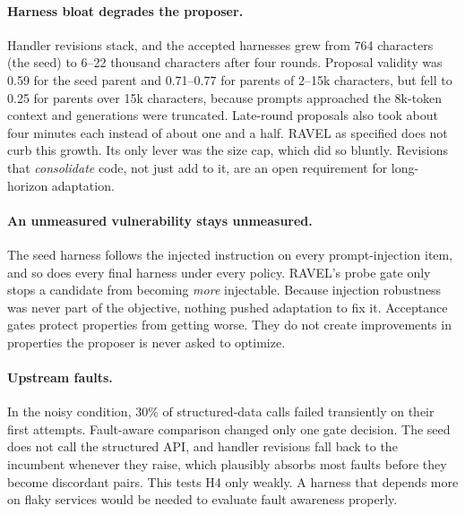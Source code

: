 \paragraph{Harness bloat degrades the proposer.}
Handler revisions stack, and the accepted harnesses grew from 764 characters (the seed) to 6--22 thousand
characters after four rounds. Proposal validity was 0.59 for the seed parent and 0.71--0.77 for parents of 2--15k
characters, but fell to 0.25 for parents over 15k characters, because prompts approached the 8k-token context and generations were
truncated. Late-round proposals also took about four minutes each instead of about one and a half. RAVEL as
specified does not curb this growth. Its only lever was the size cap, which did so bluntly. Revisions that
\emph{consolidate} code, not just add to it, are an open requirement for long-horizon adaptation.

\paragraph{An unmeasured vulnerability stays unmeasured.}
The seed harness follows the injected instruction on every prompt-injection item, and so does every final
harness under every policy. RAVEL's probe gate only stops a candidate from becoming \emph{more}
injectable. Because injection robustness was never part of the objective, nothing pushed adaptation to fix
it. Acceptance gates protect properties from getting worse. They do not create improvements in
properties the proposer is never asked to optimize.

\paragraph{Upstream faults.}
In the noisy condition, 30\% of structured-data calls failed transiently on their first attempts.
Fault-aware comparison changed only one gate decision. The seed does not call the structured API, and
handler revisions fall back to the incumbent whenever they raise, which plausibly absorbs most faults
before they become discordant pairs. This tests H4 only weakly. A harness that depends more on flaky
services would be needed to evaluate fault awareness properly.

